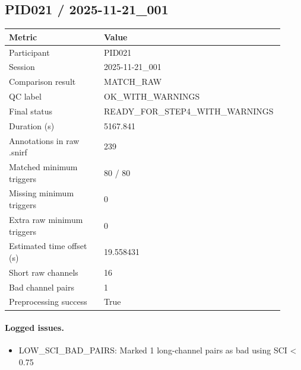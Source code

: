 \subsection*{PID021 / 2025-11-21\_001}
\begin{tabular}{p{0.34\linewidth}p{0.58\linewidth}}
\toprule
Metric & Value\\
\midrule
Participant & PID021\\
Session & 2025-11-21\_001\\
Comparison result & MATCH\_RAW\\
QC label & OK\_WITH\_WARNINGS\\
Final status & READY\_FOR\_STEP4\_WITH\_WARNINGS\\
Duration (s) & 5167.841\\
Annotations in raw .snirf & 239\\
Matched minimum triggers & 80 / 80\\
Missing minimum triggers & 0\\
Extra raw minimum triggers & 0\\
Estimated time offset (s) & 19.558431\\
Short raw channels & 16\\
Bad channel pairs & 1\\
Preprocessing success & True\\
\bottomrule
\end{tabular}
\paragraph{Logged issues.}
\begin{itemize}
\item [WARNING] LOW\_SCI\_BAD\_PAIRS: Marked 1 long-channel pairs as bad using SCI < 0.75
\end{itemize}
